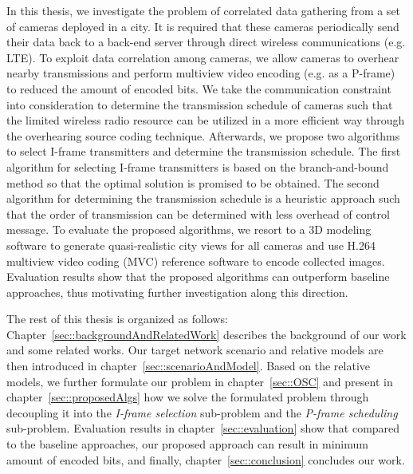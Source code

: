 In this thesis, we investigate the problem of correlated data gathering from a set of cameras deployed in a city.
It is required that these cameras periodically send their data back to a back-end server through direct wireless communications (e.g. LTE).
To exploit data correlation among cameras, we allow cameras to overhear nearby transmissions and perform multiview video encoding (e.g. as a P-frame) to reduced the amount of encoded bits.
We take the communication constraint into consideration to determine the transmission schedule of cameras such that the limited wireless radio resource can be utilized in a more efficient way through the overhearing source coding technique.
Afterwards, we propose two algorithms to select I-frame transmitters and determine the transmission schedule.
The first algorithm for selecting I-frame transmitters is based on the branch-and-bound method so that the optimal solution is promised to be obtained.
The second algorithm for determining the transmission schedule is a heuristic approach such that the order of transmission can be determined with less overhead of control message.
To evaluate the proposed algorithms, we resort to a 3D modeling software to generate quasi-realistic city views for all cameras and use H.264 multiview video coding (MVC) reference software to encode collected images.
Evaluation results show that the proposed algorithms can outperform baseline approaches, thus motivating further investigation along this direction.

The rest of this thesis is organized as follows:
Chapter~\ref{sec::backgroundAndRelatedWork} describes the background of our work and some related works.
Our target network scenario and relative models are then introduced in chapter~\ref{sec::scenarioAndModel}.
Based on the relative models, we further formulate our problem in chapter~\ref{sec::OSC} and present in chapter~\ref{sec::proposedAlgs} how we solve the formulated problem through decoupling it into the {\em I-frame selection} sub-problem and the {\em P-frame scheduling} sub-problem. 
Evaluation results in chapter~\ref{sec::evaluation} show that compared to the baseline approaches, our proposed approach can result in minimum amount of encoded bits, and finally, chapter~\ref{sec::conclusion} concludes our work.